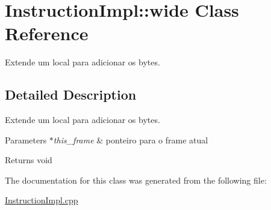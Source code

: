 \hypertarget{class_instruction_impl_1_1wide}{}\section{Instruction\+Impl\+:\+:wide Class Reference}
\label{class_instruction_impl_1_1wide}


Extende um local para adicionar os bytes.  




\subsection{Detailed Description}
Extende um local para adicionar os bytes. 


\begin{DoxyParams}{Parameters}
{\em $\ast$this\+\_\+frame} & ponteiro para o frame atual \\
\hline
\end{DoxyParams}
\begin{DoxyReturn}{Returns}
void 
\end{DoxyReturn}


The documentation for this class was generated from the following file\+:\begin{DoxyCompactItemize}
\item 
\hyperlink{_instruction_impl_8cpp}{Instruction\+Impl.\+cpp}\end{DoxyCompactItemize}
